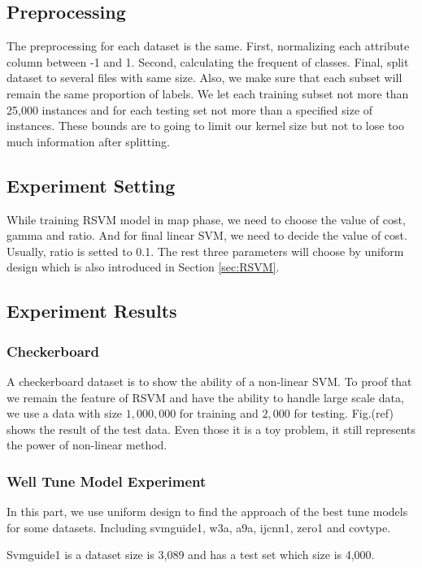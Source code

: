 \documentclass[conference]{IEEEtran}
\begin{document}
\subsection{Preprocessing}
The preprocessing for each dataset is the same. First, normalizing each attribute column between -1 and 1. Second, calculating the frequent of classes. Final, split dataset to several files with same size. Also, we make sure that each subset will remain the same proportion of labels. We let each training subset not more than 25,000 instances and for each testing set not more than a specified size of instances. These bounds are to going to limit our kernel size but not to lose too much information after splitting. 

\subsection{Experiment Setting}
While training RSVM model in map phase, we need to choose the value of cost, gamma and ratio. And for final linear SVM, we need to decide the value of cost. Usually, ratio is setted to 0.1. The rest three parameters will choose by uniform design\cite{fang2000uniform} which is also introduced in Section \ref{sec:RSVM}.

\subsection{Experiment Results}
\subsubsection{Checkerboard}
A checkerboard dataset is to show the ability of a non-linear SVM. To proof that we remain the feature of RSVM and have the ability to handle large scale data, we use a data with size $1,000,000$ for training and $2,000$ for testing. Fig.(ref) shows the result of the test data. Even those it is a toy problem, it still represents the power of non-linear method.

\subsubsection{Well Tune Model Experiment}
In this part, we use uniform design to find the approach of the best tune models for some datasets. Including svmguide1, w3a, a9a, ijcnn1, zero1 and covtype. 

Svmguide1 is a dataset size is 3,089 and has a test set which size is 4,000.
\end{document}
